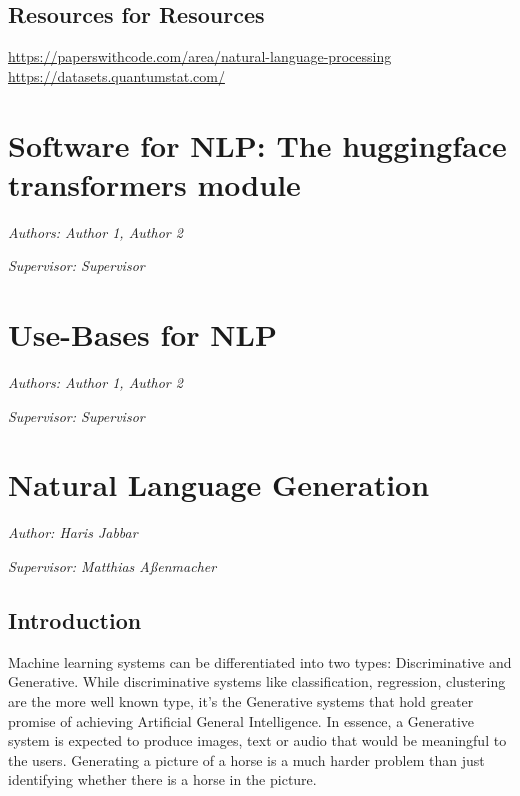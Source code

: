 \documentclass[]{krantz}
\begin{document}
\hypertarget{resources-for-resources}{%
\section{Resources for Resources}\label{resources-for-resources}}

\url{https://paperswithcode.com/area/natural-language-processing}
\url{https://datasets.quantumstat.com/}

\hypertarget{software-for-nlp-the-huggingface-transformers-module}{%
\chapter{Software for NLP: The huggingface transformers module}\label{software-for-nlp-the-huggingface-transformers-module}}

\emph{Authors: Author 1, Author 2}

\emph{Supervisor: Supervisor}

\hypertarget{use-bases-for-nlp}{%
\chapter{Use-Bases for NLP}\label{use-bases-for-nlp}}

\emph{Authors: Author 1, Author 2}

\emph{Supervisor: Supervisor}

\hypertarget{natural-language-generation}{%
\chapter{Natural Language Generation}\label{natural-language-generation}}

\emph{Author: Haris Jabbar}

\emph{Supervisor: Matthias Aßenmacher}

\hypertarget{introduction-2}{%
\section{Introduction}\label{introduction-2}}

Machine learning systems can be differentiated into two types: Discriminative and Generative. While discriminative systems like classification, regression, clustering are the more well known type, it's the Generative systems that hold greater promise of achieving Artificial General Intelligence. In essence, a Generative system is expected to produce images, text or audio that would be meaningful to the users. Generating a picture of a horse is a much harder problem than just identifying whether there is a horse in the picture.
\end{document}

